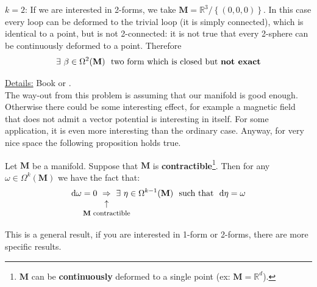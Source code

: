 \documentclass[../main.tex]{subfiles}
\begin{document}
\begin{example}
\underline{$k=2$}: If we are interested in 2-forms, we take $\mathbf{M}=\mathbb{R}^3\slash \left\{\left(0,0,0\right)\right\}$. In this case every loop can be deformed to the trivial loop (it is simply connected), which is identical to a point, but is not 2-connected: it is not true that every 2-sphere can be continuously deformed to a point. Therefore
\[\exists \ \beta \in \Omega^2(\mathbf{M})\ \textrm{ two form which is closed but \textbf{not exact}}\]
\end{example}
\underline{Details:} Book \cite{von1978differential} or \cite{doCarmo1994}.\\
The way-out from this problem is assuming that our manifold is good enough. Otherwise there could be some interesting effect, for example a magnetic field that does not admit a vector potential is interesting in itself. For some application, it is even more interesting than the ordinary case. Anyway, for very nice space the following proposition holds true.
\begin{proposition}
Let $\mathbf{M}$ be a manifold. Suppose that $\mathbf{M}$ is \textbf{contractible}\footnote{$\mathbf{M}$ can be \textbf{continuously} deformed to a single point (ex: $\mathbf{M}=\mathbb{R}^d$).}. Then for any $\omega\in\Omega^k(\mathbf{M})$ we have the fact that:
\[
\textrm{d}\omega=0 \ \underset{\mathclap{\tikz \node {$\uparrow$} node [below=1ex] {\footnotesize $\mathbf{M}$ contractible };}}{\Rightarrow} \ \exists \ \eta\in\Omega^{k-1}(\mathbf{M}) \ \textrm{ such that } \ \textrm{d}\eta = \omega
\]
\end{proposition}
This is a general result, if you are interested in 1-form or 2-forms, there are more specific results.
\end{document}
